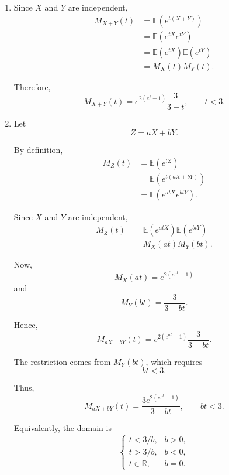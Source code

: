 \documentclass[11pt]{article}
\newenvironment{solution}{
    \par
    \begin{tcolorbox}[
        colback=white,
        colframe=uwgold,
        boxrule=0.7pt,
        arc=2mm,
        left=3mm,
        right=3mm,
        top=2mm,
        bottom=2mm,
        breakable,
        before skip=0.5em,
        after skip=1em,
        title=\textbf{Solution},
        coltitle=uwpurple,
        fonttitle=\bfseries
    ]
}{
    \end{tcolorbox}
}
\newcommand{\E}{\mathbb{E}}
\begin{document}
\begin{solution}

\begin{enumerate}[label=(\alph*)]

\item Since \(X\) and \(Y\) are independent,
\[
\begin{aligned}
M_{X+Y}(t)
&=
\E\left(e^{t(X+Y)}\right)\\
&=
\E\left(e^{tX}e^{tY}\right)\\
&=
\E\left(e^{tX}\right)
\E\left(e^{tY}\right)\\
&=
M_X(t)M_Y(t).
\end{aligned}
\]

Therefore,
\[
M_{X+Y}(t)
=
e^{2(e^t-1)}
\frac{3}{3-t},
\qquad t<3.
\]


\item Let
\[
Z=aX+bY.
\]

By definition,
\[
\begin{aligned}
M_Z(t)
&=
\E\left(e^{tZ}\right)\\
&=
\E\left(e^{t(aX+bY)}\right)\\
&=
\E\left(e^{atX}e^{btY}\right).
\end{aligned}
\]

Since \(X\) and \(Y\) are independent,
\[
\begin{aligned}
M_Z(t)
&=
\E\left(e^{atX}\right)
\E\left(e^{btY}\right)\\
&=
M_X(at)M_Y(bt).
\end{aligned}
\]

Now,
\[
M_X(at)
=
e^{2(e^{at}-1)}
\]
and
\[
M_Y(bt)
=
\frac{3}{3-bt}.
\]

Hence,
\[
M_{aX+bY}(t)
=
e^{2(e^{at}-1)}
\frac{3}{3-bt}.
\]

The restriction comes from \(M_Y(bt)\), which requires
\[
bt<3.
\]

Thus,
\[
M_{aX+bY}(t)
=
\frac{3e^{2(e^{at}-1)}}{3-bt},
\qquad bt<3.
\]

Equivalently, the domain is
\[
\begin{cases}
t<3/b, & b>0,\\
t>3/b, & b<0,\\
t\in\mathbb{R}, & b=0.
\end{cases}
\]

\end{enumerate}

\end{solution}
\end{document}
